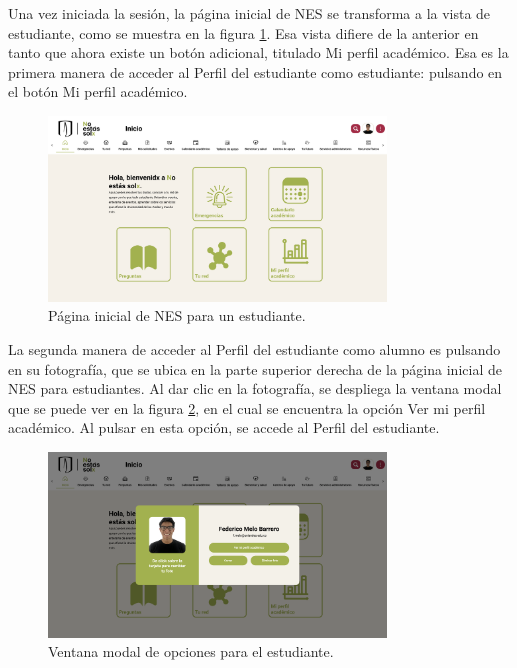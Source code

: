 Una vez iniciada la sesión, la página inicial de NES se transforma a la vista de estudiante, como se muestra en la figura \ref{fig:landing_estudiante}. Esa vista difiere de la anterior en tanto que ahora existe un botón adicional, titulado Mi perfil académico. Esa es la primera manera de acceder al Perfil del estudiante como estudiante: pulsando en el botón Mi perfil académico.

\begin{figure}[H]
  \centering
  \includegraphics[width=0.8\textwidth]{img/nes/landing_estudiante.png}
  \caption{Página inicial de NES para un estudiante.}
  \label{fig:landing_estudiante}
\end{figure}

La segunda manera de acceder al Perfil del estudiante como alumno es pulsando en su fotografía, que se ubica en la parte superior derecha de la página inicial de \gls{NES} para estudiantes. Al dar clic en la fotografía, se despliega la ventana modal que se puede ver en la figura \ref{fig:menu_estudiante}, en el cual se encuentra la opción Ver mi perfil académico. Al pulsar en esta opción, se accede al Perfil del estudiante.

\begin{figure}[H]
  \centering
  \includegraphics[width=0.8\textwidth]{img/nes/menu_estudiante.png}
  \caption{Ventana modal de opciones para el estudiante.}
  \label{fig:menu_estudiante}
\end{figure}

